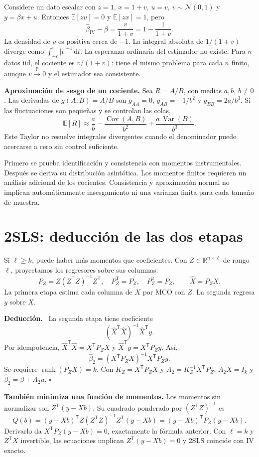\documentclass[11pt,a4paper]{article}
\newcommand{\R}{\mathbb R}
\newcommand{\E}{\mathbb E}
\newcommand{\Prob}{\mathbb P}
\newcommand{\T}{^{\mathsf T}}
\newcommand{\dd}{\,\mathrm d}
\newcommand{\abs}[1]{\left\lvert #1\right\rvert}
\DeclareMathOperator{\Var}{Var}
\DeclareMathOperator{\Cov}{Cov}
\DeclareMathOperator{\rank}{rank}
\newcommand{\pto}{\xrightarrow{\Prob}}
\newcommand{\Normal}{\mathcal N}
\newcommand{\topic}[2]{\clearpage\section{#1}\label{#2}}
\newenvironment{deduccion}{\par\textbf{Deducción.}\ }{\hfill$\square$\par}
\theoremstyle{definition}\newtheorem{definicion}[teorema]{Definición}
\begin{document}
\begin{ejemplo}
Considere un dato escalar con $z=1$, $x=1+v$, $u=v$,
$v\sim\Normal(0,1)$ y $y=\beta x+u$.
Entonces $\E[zu]=0$ y $\E[zx]=1$, pero
\[
\widehat\beta_{\mathrm{IV}}-\beta
=\frac{v}{1+v}=1-\frac1{1+v}.
\]
La densidad de $v$ es positiva cerca de $-1$.
La integral absoluta de $1/(1+v)$ diverge como
$\int_{-\varepsilon}^{\varepsilon}\abs t^{-1}\dd t$.
La esperanza ordinaria del estimador no existe.
Para $n$ datos iid, el cociente es
$\bar v/(1+\bar v)$: tiene el mismo problema para cada $n$ finito,
aunque $\bar v\pto0$ y el estimador sea consistente.
\end{ejemplo}
\textbf{Aproximación de sesgo de un cociente.}
Sea $R=A/B$, con medias $a,b$, $b\ne0$.
Las derivadas de $g(A,B)=A/B$ son
$g_{AA}=0$, $g_{AB}=-1/b^2$ y $g_{BB}=2a/b^3$.
Si las fluctuaciones son pequeñas y se controlan las colas,
\[
\E[R]\approx \frac ab
-\frac{\Cov(A,B)}{b^2}+\frac{a\,\Var(B)}{b^3}.
\]
Este Taylor no resuelve integrales divergentes cuando el denominador
puede acercarse a cero sin control suficiente.

\begin{idea}
Primero se prueba identificación y consistencia con momentos instrumentales.
Después se deriva su distribución asintótica.
Los momentos finitos requieren un análisis adicional de los cocientes.
Consistencia y aproximación normal no implican automáticamente
insesgamiento ni una varianza finita para cada tamaño de muestra.
\end{idea}

\topic{2SLS: deducción de las dos etapas}{s45}
Si $\ell\ge k$, puede haber más momentos que coeficientes.
Con $Z\in\R^{n\times\ell}$ de rango $\ell$, proyectamos los regresores
sobre sus columnas:
\[
P_Z=Z(Z\T Z)^{-1}Z\T,\quad P_Z\T=P_Z,\quad P_Z^2=P_Z,\qquad
\widehat X=P_ZX.
\]
La primera etapa estima cada columna de $X$ por MCO con $Z$.
La segunda regresa $y$ sobre $\widehat X$.

\begin{deduccion}
La segunda etapa tiene coeficiente
\[
(\widehat X\T\widehat X)^{-1}\widehat X\T y.
\]
Por idempotencia,
$\widehat X\T\widehat X=X\T P_ZX$ y
$\widehat X\T y=X\T P_Zy$. Así,
\[
\boxed{\widehat\beta_2=(X\T P_ZX)^{-1}X\T P_Zy}.
\]
Se requiere $\rank(P_ZX)=k$.
Con $K_Z=X\T P_ZX$ y $A_2=K_Z^{-1}X\T P_Z$,
$A_2X=I_k$ y $\widehat\beta_2=\beta+A_2u$.
\end{deduccion}
\textbf{También minimiza una función de momentos.}
Los momentos sin normalizar son $Z\T(y-Xb)$.
Su cuadrado ponderado por $(Z\T Z)^{-1}$ es
\[
Q(b)=(y-Xb)\T Z(Z\T Z)^{-1}Z\T(y-Xb)
=(y-Xb)\T P_Z(y-Xb).
\]
Derivarlo da $X\T P_Z(y-Xb)=0$, exactamente la fórmula anterior.
Con $\ell=k$ y $Z\T X$ invertible, las ecuaciones implican
$Z\T(y-Xb)=0$ y 2SLS coincide con IV exacto.
\end{document}
